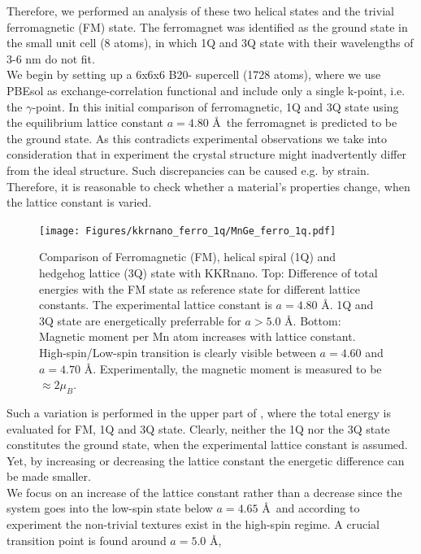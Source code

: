 \documentclass [a4paper, 12pt]{article}
\begin{document}
Therefore, we performed
an analysis of these two helical states and the trivial ferromagnetic (FM) state.
The ferromagnet was identified as the ground state in the small unit cell (8 atoms), 
in which 1Q and 3Q state with their wavelengths of
3-6 nm do not fit.
\\
We begin by setting up a 6x6x6 B20- supercell (1728 atoms), where we use PBEsol 
as exchange-correlation functional
and include only a single k-point, i.e. the $\gamma$-point.
In this initial comparison of ferromagnetic, 1Q and 3Q state using the equilibrium lattice constant
$a=4.80$ \AA \, the ferromagnet is predicted to be the ground state.
As this contradicts experimental observations we take into consideration that
in experiment the crystal structure might inadvertently differ from the ideal structure.
Such discrepancies can be caused e.g. by strain.
\\
Therefore, it is reasonable to check whether a material's properties change, when the
lattice constant is varied.
\begin{figure}[h]
\begin{center}
 \texttt{[image: Figures/kkrnano\_ferro\_1q/MnGe\_ferro\_1q.pdf]}
\end{center}
\caption{
	Comparison of Ferromagnetic (FM), helical spiral (1Q) and hedgehog lattice (3Q) state with KKRnano.
	Top: Difference of total energies with the FM state as reference state for different lattice constants. 
	The experimental lattice constant is $a = 4.80$ \AA. 1Q and 3Q state are energetically preferrable 
	for $a > 5.0$ \AA. Bottom: Magnetic moment per Mn atom increases with lattice constant. 
	High-spin/Low-spin transition is clearly visible between $a = 4.60$ and $a = 4.70$ \AA.
	Experimentally, the magnetic moment is measured to be $\approx 2 \mu_{B}$.
	}
\label{fig:MnGe_ferro_1q}
\end{figure}
Such a variation is performed in the upper part of , where
the total energy is evaluated for FM, 1Q and 3Q state.
Clearly, neither the 1Q nor the 3Q state constitutes the ground state,
when the experimental lattice constant is assumed.
Yet, by increasing or decreasing the lattice constant the energetic difference can be made
smaller.
\\
We focus on an increase of the lattice constant rather than a decrease since 
the system goes into the low-spin state below $a=4.65$ \AA \, and according to experiment
the non-trivial textures
exist in the high-spin regime.
A crucial transition point is found around $a=5.0$ \AA,
\end{document}
